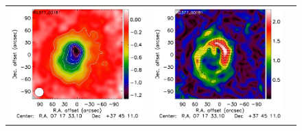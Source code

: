 \documentclass[twocolumn,traditabstract]{aa}
\begin{document}
\begin{figure}[h]
{\begin{tabular}{lll}
\includegraphics[trim=0cm 2.2cm 0cm 0cm, clip=true, scale=1]{Figure/Map_RG377_00181_Ymap_zobs0p5_processed.pdf} & 
\includegraphics[trim=2.3cm 2.2cm 0cm 0cm, clip=true, scale=1]{Figure/Grad_RG377_00181_Ymap_zobs0p5_processed_15_15_45.pdf} & 

\end{tabular}}
\end{figure}
\end{document}

